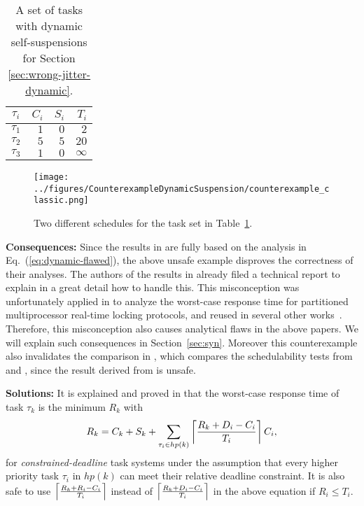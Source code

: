 \begin{table}[t]
\begin{center}
\begin{tabular}{|c|r|r|r|}
\hline
$\tau_i$ &      $C_i$   &   $S_i$  &     $T_i$     \\ \hline
$\tau_1$ &       $1$   &     $0$  &       $2$     \\ \hline
$\tau_2$  &      $5$   &     $5$  &      $20$     \\ \hline
$\tau_3$  &      $1$   &     $0$  &  $\infty$     \\ \hline
\end{tabular}
\end{center}
\caption{A set of tasks with dynamic self-suspensions for Section \ref{sec:wrong-jitter-dynamic}.}
\label{tab:counterexample-dynamic-suspension}
\end{table}

\begin{figure}[t]
\begin{center}
\texttt{[image: ../figures/CounterexampleDynamicSuspension/counterexample\_classic.png]}
\end{center}
\caption{Two different schedules for the task set in Table~\ref{tab:counterexample-dynamic-suspension}.}
\label{fig:counterexample-dynamic}
\end{figure}

{\bf Consequences:} Since the results in \cite{ECRTS-AudsleyB04,RTAS-AudsleyB04,RTCSA-KimCPKH95} are fully based on the analysis in Eq.~(\ref{eq:dynamic-flawed}), the above unsafe example disproves the correctness of their analyses. The authors of the results in \cite{ECRTS-AudsleyB04,RTAS-AudsleyB04} already filed a technical report \cite{BletsasReport2015} to explain in a great detail how to handle this. This misconception was unfortunately applied in \cite{lakshmanan-2009} to analyze the worst-case response time for
partitioned multiprocessor real-time locking protocols, and reused in several other works~\cite{zeng-2011,bbb-2013,yang-2013,kim-2014,han-2014,carminati-2014,yang-2014}. Therefore, this misconception also causes analytical flaws in the above papers. We will explain such consequences in Section~\ref{sec:syn}.
Moreover this counterexample also invalidates the comparison in \cite{RidouardR06}, which compares the schedulability tests from \cite{RTCSA-KimCPKH95} and \cite[Page 164-165]{Liu:2000:RS:518501}, since the result derived from \cite{RTCSA-KimCPKH95} is unsafe.

{\bf Solutions:} It is explained and proved in \cite{huangpass:dac2015,BletsasReport2015} that the worst-case response time of task $\tau_k$ is the minimum $R_k$ with
\begin{equation}
R_k = C_k+ S_k+\sum_{\tau_i \in hp(k)}\left\lceil{\frac{R_k+D_i-C_i}{T_i}}\right\rceil C_i,
\label{eq:dynamic-correct}
\end{equation}
for \emph{constrained-deadline} task systems under the assumption that every higher priority task $\tau_i$ in $hp(k)$ can meet their relative deadline constraint. It is also safe to use $\left\lceil{\frac{R_k+R_i-C_i}{T_i}}\right\rceil$ instead of $\left\lceil{\frac{R_k+D_i-C_i}{T_i}}\right\rceil$ in the above equation if $R_i \leq T_i$.

